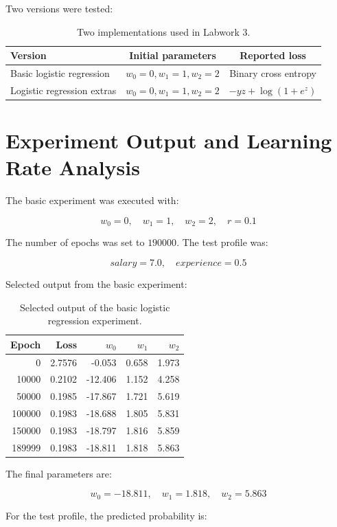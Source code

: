 \documentclass[12pt,a4paper]{article}
\begin{document}
Two versions were tested:

\begin{table}[H]
\centering
\begin{tabular}{lcc}
\toprule
Version & Initial parameters & Reported loss \\
\midrule
Basic logistic regression & \(w_0=0, w_1=1, w_2=2\) & Binary cross entropy \\
Logistic regression extras & \(w_0=0, w_1=1, w_2=2\) & \(-yz + \log(1+e^z)\) \\
\bottomrule
\end{tabular}
\caption{Two implementations used in Labwork 3.}
\end{table}

\section{Experiment Output and Learning Rate Analysis}

The basic experiment was executed with:

\[
w_0 = 0, \quad w_1 = 1, \quad w_2 = 2, \quad r = 0.1
\]

The number of epochs was set to \(190000\). The test profile was:

\[
salary = 7.0, \quad experience = 0.5
\]

Selected output from the basic experiment:

\begin{table}[H]
\centering
\begin{tabular}{rrrrr}
\toprule
Epoch & Loss & \(w_0\) & \(w_1\) & \(w_2\) \\
\midrule
0 & 2.7576 & -0.053 & 0.658 & 1.973 \\
10000 & 0.2102 & -12.406 & 1.152 & 4.258 \\
50000 & 0.1985 & -17.867 & 1.721 & 5.619 \\
100000 & 0.1983 & -18.688 & 1.805 & 5.831 \\
150000 & 0.1983 & -18.797 & 1.816 & 5.859 \\
189999 & 0.1983 & -18.811 & 1.818 & 5.863 \\
\bottomrule
\end{tabular}
\caption{Selected output of the basic logistic regression experiment.}
\end{table}

The final parameters are:

\[
w_0 = -18.811, \quad w_1 = 1.818, \quad w_2 = 5.863
\]

For the test profile, the predicted probability is:
\end{document}
